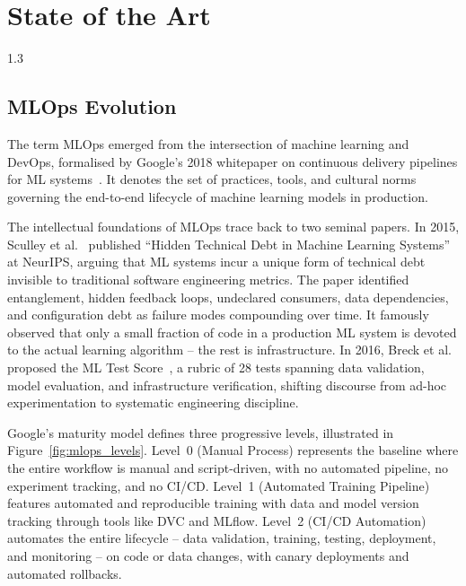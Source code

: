 
\chapter{State of the Art}
\begin{spacing}{1.3}

\section{MLOps Evolution}

The term MLOps emerged from the intersection of machine learning and DevOps, formalised by Google's 2018 whitepaper on continuous delivery pipelines for ML systems~\cite{google_mlops}. It denotes the set of practices, tools, and cultural norms governing the end-to-end lifecycle of machine learning models in production.

The intellectual foundations of MLOps trace back to two seminal papers. In 2015, Sculley et al.~\cite{sculley2015} published ``Hidden Technical Debt in Machine Learning Systems'' at NeurIPS, arguing that ML systems incur a unique form of technical debt invisible to traditional software engineering metrics. The paper identified entanglement, hidden feedback loops, undeclared consumers, data dependencies, and configuration debt as failure modes compounding over time. It famously observed that only a small fraction of code in a production ML system is devoted to the actual learning algorithm -- the rest is infrastructure. In 2016, Breck et al. proposed the ML Test Score~\cite{breck2016}, a rubric of 28 tests spanning data validation, model evaluation, and infrastructure verification, shifting discourse from ad-hoc experimentation to systematic engineering discipline.

Google's maturity model defines three progressive levels, illustrated in Figure~\ref{fig:mlops_levels}. Level~0 (Manual Process) represents the baseline where the entire workflow is manual and script-driven, with no automated pipeline, no experiment tracking, and no CI/CD. Level~1 (Automated Training Pipeline) features automated and reproducible training with data and model version tracking through tools like DVC and MLflow. Level~2 (CI/CD Automation) automates the entire lifecycle -- data validation, training, testing, deployment, and monitoring -- on code or data changes, with canary deployments and automated rollbacks.


\end{spacing}
